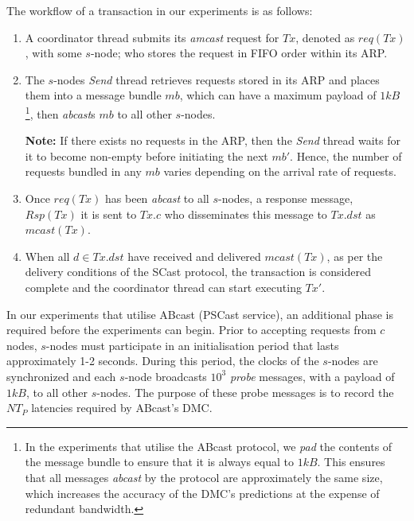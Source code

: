 	The workflow of a transaction in our experiments is as follows:
    \begin{enumerate}
        \item    A coordinator thread submits its \emph{amcast} request for $Tx$, denoted as $req(Tx)$, with some $s$-node; who stores the request in FIFO order within its ARP. 
        
        \item    The $s$-nodes \emph{Send} thread retrieves requests stored in its ARP and places them into a message bundle $mb$, which can have a maximum payload of $1kB$ \footnote{In the experiments that utilise the \textsf{ABcast} protocol, we \emph{pad} the contents of the message bundle to ensure that it is always equal to $1kB$.  This ensures that all messages \emph{abcast} by the protocol are approximately the same size, which increases the accuracy of the DMC's predictions at the expense of redundant bandwidth.}, then \emph{abcast}s $mb$ to all other $s$-nodes.  
        
        \textbf{Note:} If there exists no requests in the ARP, then the \emph{Send} thread waits for it to become non-empty before initiating the next $mb'$.  Hence, the number of requests bundled in any $mb$ varies depending on the arrival rate of requests. 
        
        \item    Once $req(Tx)$ has been \emph{abcast} to all $s$-nodes, a response message, $Rsp(Tx)$ it is sent to $Tx.c$ who disseminates this message to $Tx.dst$ as $mcast(Tx)$.  
        
        \item    When all $d \in Tx.dst$ have received and delivered $mcast(Tx)$, as per the delivery conditions of the \textsf{SCast} protocol, the transaction is considered complete and the coordinator thread can start executing $Tx'$.  
    \end{enumerate}	
	
    In our experiments that utilise \textsf{ABcast} (\textsf{PSCast} service), an additional phase is required before the experiments can begin.  Prior to accepting requests from $c$ nodes, $s$-nodes must participate in an initialisation period that lasts approximately 1-2 seconds.  During this period, the clocks of the $s$-nodes are synchronized and each $s$-node broadcasts $10^3$ \emph{probe} messages, with a payload of $1kB$, to all other $s$-nodes.  The purpose of these probe messages is to record the $NT_P$ latencies required by \textsf{ABcast}'s DMC.  
    
